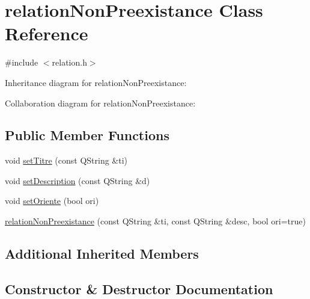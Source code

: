 \hypertarget{classrelationNonPreexistance}{}\section{relation\+Non\+Preexistance Class Reference}
\label{classrelationNonPreexistance}


{\ttfamily \#include $<$relation.\+h$>$}



Inheritance diagram for relation\+Non\+Preexistance\+:


Collaboration diagram for relation\+Non\+Preexistance\+:
\subsection*{Public Member Functions}
\begin{DoxyCompactItemize}
\item 
void \hyperlink{classrelationNonPreexistance_ae3d01f6d8c081235d54f6494b7de81c5}{set\+Titre} (const Q\+String \&ti)
\item 
void \hyperlink{classrelationNonPreexistance_a97321894a56ce237fdf37ae35d95f771}{set\+Description} (const Q\+String \&d)
\item 
void \hyperlink{classrelationNonPreexistance_a4ecfa15030cff3caab09cfe7ed76fc68}{set\+Oriente} (bool ori)
\item 
\hyperlink{classrelationNonPreexistance_a0b1f7788ba51e527c71587c3b228272d}{relation\+Non\+Preexistance} (const Q\+String \&ti, const Q\+String \&desc, bool ori=true)
\end{DoxyCompactItemize}
\subsection*{Additional Inherited Members}


\subsection{Constructor \& Destructor Documentation}
